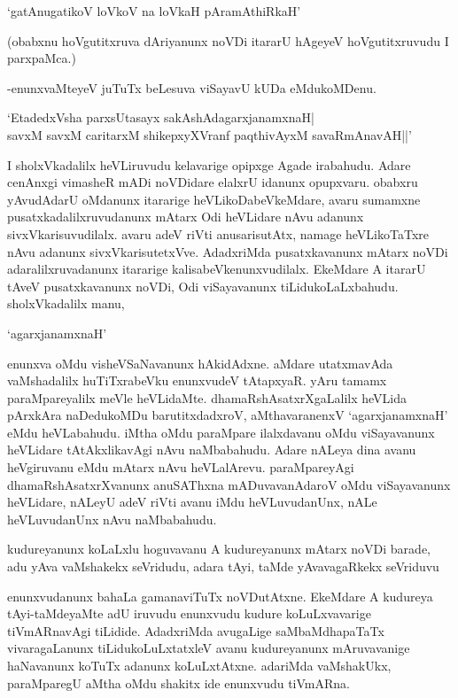 \begin{shloka} 
`gatAnugatikoV loVkoV na loVkaH pAramAthiRkaH'
\end{shloka}

(obabxnu hoVgutitxruva dAriyanunx noVDi itararU hAgeyeV hoVgutitxruvudu I parxpaMca.)

-enunxvaMteyeV juTuTx beLesuva viSayavU kUDa eMdukoMDenu. 

\begin{shloka}
`EtadedxVsha parxsUtasayx sakAshAdagarxjanamxnaH|\\
savxM savxM caritarxM shikepxyXVranf paqthivAyxM savaRmAnavAH||'
\end{shloka}

I sholxVkadalilx heVLiruvudu kelavarige opipxge Agade irabahudu. Adare cenAnxgi vimasheR mADi noVDidare elalxrU idanunx opupxvaru. obabxru yAvudAdarU oMdanunx itararige heVLikoDabeVkeMdare, avaru sumamxne pusatxkadalilxruvudanunx mAtarx Odi heVLidare nAvu adanunx sivxVkarisuvudilalx. avaru adeV riVti anusarisutAtx, namage heVLikoTaTxre nAvu adanunx sivxVkarisutetxVve. AdadxriMda pusatxkavanunx mAtarx noVDi adaralilxruvadanunx itararige kalisabeVkenunxvudilalx. EkeMdare A itararU tAveV pusatxkavanunx noVDi, Odi viSayavanunx tiLidukoLaLxbahudu. sholxVkadalilx manu, 

\begin{shloka}
`agarxjanamxnaH'
\end{shloka}
 
enunxva oMdu visheVSaNavanunx hAkidAdxne. aMdare utatxmavAda vaMshadalilx huTiTxrabeVku enunxvudeV tAtapxyaR. yAru tamamx paraMpareyalilx meVle heVLidaMte. dhamaRshAsatxrXgaLalilx heVLida pArxkAra naDedukoMDu barutitxdadxroV, aMthavaranenxV `agarxjanamxnaH' eMdu heVLabahudu. iMtha oMdu paraMpare ilalxdavanu oMdu viSayavanunx heVLidare tAtAkxlikavAgi nAvu naMbabahudu. Adare nALeya dina avanu heVgiruvanu eMdu mAtarx nAvu heVLalArevu. paraMpareyAgi dhamaRshAsatxrXvanunx anuSAThxna mADuvavanAdaroV oMdu viSayavanunx heVLidare, nALeyU adeV riVti avanu iMdu heVLuvudanUnx, nALe heVLuvudanUnx nAvu naMbabahudu.

kudureyanunx koLaLxlu hoguvavanu A kudureyanunx mAtarx noVDi barade, adu yAva vaMshakekx seVridudu, adara tAyi, taMde yAvavagaRkekx seVriduvu

enunxvudanunx bahaLa gamanaviTuTx noVDutAtxne. EkeMdare A kudureya tAyi-taMdeyaMte adU iruvudu enunxvudu kudure koLuLxvavarige tiVmARnavAgi tiLidide. AdadxriMda avugaLige saMbaMdhapaTaTx vivaragaLanunx tiLidukoLuLxtatxleV avanu kudureyanunx mAruvavanige haNavanunx koTuTx adanunx koLuLxtAtxne. adariMda vaMshakUkx, paraMparegU aMtha oMdu shakitx ide enunxvudu tiVmARna.

